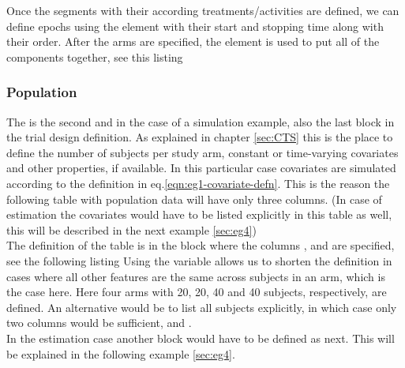 
Once the segments with their according treatments/activities are defined, we can define epochs using the
element  with their start and stopping time along with their order.
After the arms are specified, the  element is used to put all of the components together, see this listing 

\subsubsection{Population}

The  is the second and in the case of a simulation example,
also the last block in the trial design definition. As explained in chapter \ref{sec:CTS}
this is the place to define the number of subjects per study arm, constant
or time-varying covariates and other properties, if available.
In this particular case covariates are simulated according to 
the definition in eq.\ref{eqn:eg1-covariate-defn}. This is the reason the following table with 
population data will have only three columns. (In case of estimation the covariates would have to 
be listed explicitly in this table as well, this will be described in the next example \ref{sec:eg4})\\
The definition of the table is in the  block where the columns
,  and  are specified, see the following listing 
Using the  variable allows us
to shorten the definition in cases where all other features are the same across subjects in
an arm, which is the case here. Here four arms with 20, 20, 40 and 40 subjects, respectively, are defined.
An alternative would be to list all subjects explicitly, in which case only two columns would be
sufficient,  and .\\
In the estimation case another block  would have to be defined as next.
This will be explained in the following example \ref{sec:eg4}.



